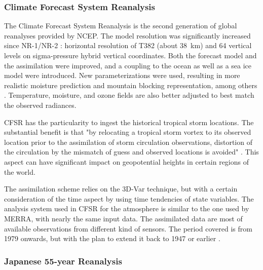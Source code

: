 \documentclass{ametsoc}
\begin{document}
\subsubsection{Climate Forecast System Reanalysis}

The Climate Forecast System Reanalysis \citep[CFSR, ][]{Saha2010a} is the second generation of global reanalyses provided by NCEP. The model resolution was significantly increased since NR-1/NR-2 : horizontal resolution of T382 (about 38~km) and 64 vertical levels on sigma-pressure hybrid vertical coordinates. Both the forecast model and the assimilation were improved, and a coupling to the ocean as well as a sea ice model were introduced. New parameterizations were used, resulting in more realistic moisture prediction and mountain blocking representation, among others \citep{Saha2010a}. Temperature, moisture, and ozone fields are also better adjusted to best match the observed radiances.

CFSR has the particularity to ingest the historical tropical storm locations. The substantial benefit is that "by relocating a tropical storm vortex to its observed location prior to the assimilation of storm circulation observations, distortion of the circulation by the mismatch of guess and observed locations is avoided" \citep{Saha2010a}. This aspect can have significant impact on geopotential heights in certain regions of the world.

The assimilation scheme relies on the 3D-Var technique, but with a certain consideration of the time aspect by using time tendencies of state variables. The analysis system used in CFSR for the atmosphere is similar to the one used by MERRA, with nearly the same input data. The assimilated data are most of available observations from different kind of sensors. The period covered is from 1979 onwards, but with the plan to extend it back to 1947 or earlier \citep{Saha2010a}.


\subsubsection{Japanese 55-year Reanalysis}
\end{document}

